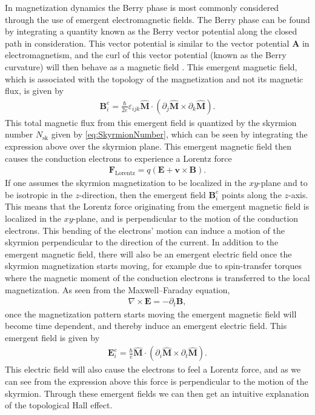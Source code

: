 In magnetization dynamics the Berry phase is most commonly considered through the use of emergent electromagnetic fields. The Berry phase can be found by integrating a quantity known as the Berry vector potential along the closed path in consideration. This vector potential is similar to the vector potential $\mathbold{A}$ in electromagnetism, and the curl of this vector potential (known as the Berry curvature) will then behave as a magnetic field \cite{kanazawa2015charge}. This emergent magnetic field, which is associated with the topology of the magnetization and not its magnetic flux, is given by \cite{Nagaosa2012, Schulz2012}
\begin{align}
    \mathbold{B}_i^e = \frac{\hbar}{2e}\varepsilon_{ijk}\mathbold{\hat{M}}\cdot(\partial_j\mathbold{\hat{M}}\times \partial_k \mathbold{\hat{M}}).
\end{align}
This total magnetic flux from this emergent field is quantized by the skyrmion number $N_{\textrm{sk}}$ given by \eqref{eq:SkyrmionNumber}, which can be seen by integrating the expression above over the skyrmion plane. This emergent magnetic field then causes the conduction electrons to experience a Lorentz force
\begin{align}
    \mathbold{F}_{\textrm{Lorentz}} = q(\mathbold{E} + \mathbold{v}\times\mathbold{B}).
\end{align}
If one assumes the skyrmion magnetization to be localized in the $xy$-plane and to be isotropic in the $z$-direction, then the emergent field $\mathbold{B}_i^e$ points along the $z$-axis. This means that the Lorentz force originating from the emergent magnetic field is localized in the $xy$-plane, and is perpendicular to the motion of the conduction electrons. This bending of the electrons' motion can induce a motion of the skyrmion perpendicular to the direction of the current. In addition to the emergent magnetic field, there will also be an emergent electric field once the skyrmion magnetization starts moving, for example due to spin-transfer torques where the magnetic moment of the conduction electrons is transferred to the local magnetization. As seen from the Maxwell--Faraday equation,
\begin{align}
    \nabla\times\mathbold{E} = -\partial_t\mathbold{B},
\end{align}
once the magnetization pattern starts moving the emergent magnetic field will become time dependent, and thereby induce an emergent electric field. This emergent field is given by
\begin{align}
\label{eq:EmergentE}
\mathbold{E}_i^e = \frac{\hbar}{e} \mathbold{\hat{M}}\cdot(\partial_i\mathbold{\hat{M}}\times\partial_t\mathbold{\hat{M}}).
\end{align}
This electric field will also cause the electrons to feel a Lorentz force, and as we can see from the expression above this force is perpendicular to the motion of the skyrmion. Through these emergent fields we can then get an intuitive explanation of the topological Hall effect.

